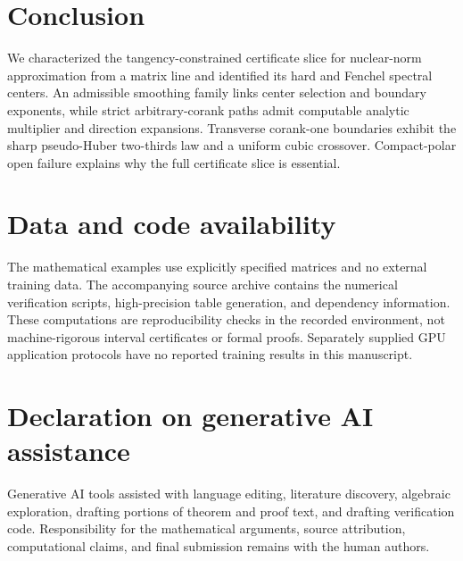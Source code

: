 \section{Conclusion}

We characterized the tangency-constrained certificate slice for nuclear-norm
approximation from a matrix line and identified its hard and Fenchel spectral
centers.  An admissible smoothing family links center selection and boundary
exponents, while strict arbitrary-corank paths admit computable analytic
multiplier and direction expansions.  Transverse corank-one boundaries
exhibit the sharp pseudo-Huber two-thirds law and a uniform cubic crossover.
Compact-polar open failure explains why the full certificate slice is
essential.

\section*{Data and code availability}

The mathematical examples use explicitly specified matrices and no external
training data.  The accompanying source archive contains the numerical
verification scripts, high-precision table generation, and dependency
information.  These computations are reproducibility checks in the recorded
environment, not machine-rigorous interval certificates or formal proofs.
Separately supplied GPU application protocols have no reported training
results in this manuscript.

\section*{Declaration on generative AI assistance}

Generative AI tools assisted with language editing, literature discovery,
algebraic exploration, drafting portions of theorem and proof text, and
drafting verification code.  Responsibility for the mathematical arguments, source attribution,
computational claims, and final submission remains with the human authors.
